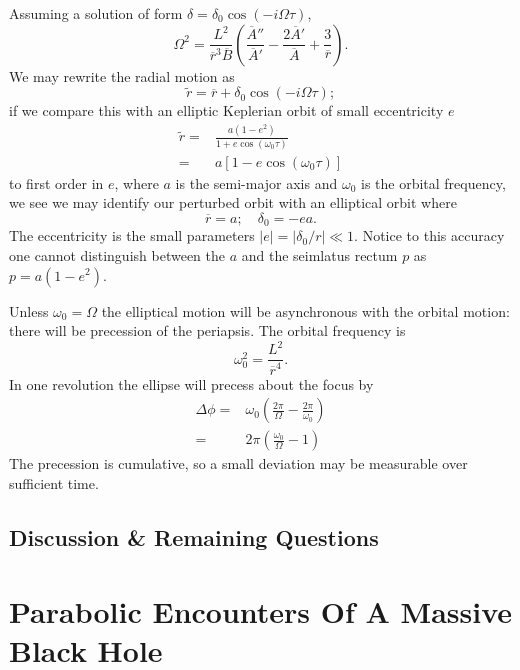 \documentclass[a4paper, 11pt, titlepage, twoside]{report}
\begin{document}
Assuming a solution of form $\delta = \delta_0\cos(-i\Omega\tau)$,
\begin{equation}
\Omega^2 = \frac{L^2}{\overline{r}^3\overline{B}}\left(\frac{\overline{A}''}{\overline{A}'} - \frac{2\overline{A}'}{\overline{A}} + \frac{3}{\overline{r}}\right).
\end{equation}
We may rewrite the radial motion as
\begin{equation}
\widetilde{r} = \overline{r} + \delta_0\cos(-i\Omega\tau);
\end{equation}
if we compare this with an elliptic Keplerian orbit of small eccentricity $e$
\begin{align}
\widetilde{r} = {} & \frac{a(1 - e^2)}{1 + e\cos(\omega_0\tau)} \\
 = {} & a\left[1 - e\cos(\omega_0\tau)\right]
\end{align}
to first order in $e$, where $a$ is the semi-major axis and $\omega_0$ is the orbital frequency, we see we may identify our perturbed orbit with an elliptical orbit where
\begin{equation}
\overline{r} = a; \quad \delta_0 = -ea.
\end{equation}
The eccentricity is the small parameters $|e| = |\delta_0/r| \ll 1$. Notice to this accuracy one cannot distinguish between the $a$ and the seimlatus rectum $p$ as $p = a(1 - e^2)$.

Unless $\omega_0 = \Omega$ the elliptical motion will be asynchronous with the orbital motion: there will be precession of the periapsis. The orbital frequency is
\begin{equation}
\omega_0^2 = \frac{L^2}{\overline{r}^4}.
\end{equation}
In one revolution the ellipse will precess about the focus by
\begin{align}
\Delta \phi = {} & \omega_0\left(\frac{2\pi}{\Omega} - \frac{2\pi}{\omega_0}\right) \nonumber \\
 = {} & 2\pi\left(\frac{\omega_0}{\Omega} - 1\right)
\end{align}
The precession is cumulative, so a small deviation may be measurable over sufficient time.
 
\section{Discussion \& Remaining Questions}



\chapter{Parabolic Encounters Of A Massive Black Hole}
\end{document}
